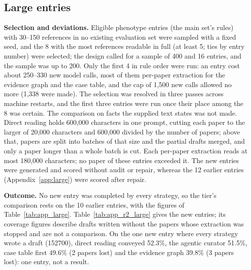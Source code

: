 \documentclass{article} %
\begin{document}
\subsection{Large entries}
\label{app:r2_large}
\textbf{Selection and deviations.} Eligible phenotype entries (the main set's rules) with 30--150 references in no existing evaluation set were sampled with a fixed seed, and the 8 with the most references readable in full (at least 5; ties by entry number) were selected; the design called for a sample of 400 and 16 entries, and the sample was up to 200. Only the first 4 in rule order were run: an entry cost about 250--330 new model calls, most of them per-paper extraction for the evidence graph and the case table, and the cap of 1,500 new calls allowed no more (1,338 were made). The selection was resolved in three passes across machine restarts, and the first three entries were run once their place among the 8 was certain. The comparison on facts the supplied text states was not made. Direct reading holds 600,000 characters in one prompt, cutting each paper to the larger of 20,000 characters and 600,000 divided by the number of papers; above that, papers are split into batches of that size and the partial drafts merged, and only a paper longer than a whole batch is cut. Each per-paper extraction reads at most 180,000 characters; no paper of these entries exceeded it. The new entries were generated and scored without audit or repair, whereas the 12 earlier entries (Appendix~\ref{app:large}) were scored after repair.

\textbf{Outcome.} No new entry was completed by every strategy, so the tier's comparison rests on the 10 earlier entries, with the figures of Table~\ref{tab:app_large}. Table~\ref{tab:app_r2_large} gives the new entries; its coverage figures describe drafts written without the papers whose extraction was stopped and are not a comparison. On the one new entry where every strategy wrote a draft (152700), direct reading conveyed 52.3\%, the agentic curator 51.5\%, case table first 49.6\% (2 papers lost) and the evidence graph 39.8\% (3 papers lost): one entry, not a result.
\end{document}
